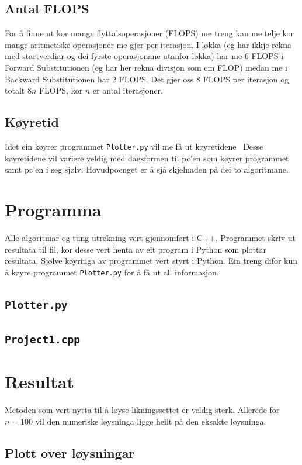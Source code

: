 \documentclass[11pt, a4paper]{article}
\begin{document}
  \subsection{Antal FLOPS}
    For å finne ut kor mange flyttalsoperasjoner (FLOPS) me treng kan me telje kor mange 
    aritmetiske operasjoner me gjer per iterasjon. I løkka (eg har ikkje rekna med startverdiar og 
    dei fyrste operasjonane utanfor løkka) har me 6 FLOPS i Forward Substitutionen (eg har her 
    rekna divisjon som ein FLOP) medan me i Backward Substitutionen har 2 FLOPS. Det gjer oss 8 FLOPS 
    per iterasjon og totalt $8n$ FLOPS, kor $n$ er antal iterasjoner.


  \subsection{Køyretid}
    Idet ein køyrer programmet \texttt{Plotter.py} vil me få ut køyretidene
     \
    Desse køyretidene vil variere veldig med dagsformen til pc'en som køyrer programmet samt
    pc'en i seg sjølv. Hovudpoenget er å sjå skjelnaden på dei to algoritmane.

\section{Programma}
  Alle algoritmar og tung utrekning vert gjennomført i C++. Programmet skriv ut resultata til fil,
  kor desse vert henta av eit program i Python som plottar resultata. Sjølve køyringa av programmet 
  vert styrt i Python. Ein treng difor kun å køyre programmet \texttt{Plotter.py} for å få ut all
  informasjon. 

  \subsection{\texttt{Plotter.py}}
   
  \subsection{\texttt{Project1.cpp}}

    
\section{Resultat}
  Metoden som vert nytta til å løyse likningssettet er veldig sterk. Allerede for $n = 100$ vil 
  den numeriske løysninga ligge heilt på den eksakte løysninga. 

  \subsection{Plott over løysningar}
\end{document}
